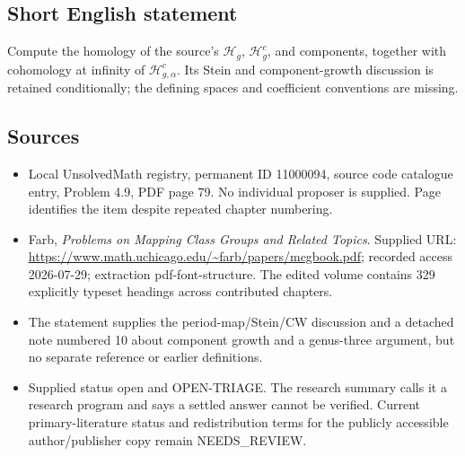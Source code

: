 \documentclass[11pt]{article}
\begin{document}
\subsection{Short English statement}
Compute the homology of the source's \(\mathcal H_g\), \(\mathcal H_g^c\), and components, together with cohomology at infinity of \(\mathcal H_{g,\alpha}^c\). Its Stein and component-growth discussion is retained conditionally; the defining spaces and coefficient conventions are missing.
\subsection{Sources}
\begin{itemize}
\item Local UnsolvedMath registry, permanent ID 11000094, source code catalogue entry, Problem 4.9, PDF page 79. No individual proposer is supplied. Page identifies the item despite repeated chapter numbering.
\item Farb, \emph{Problems on Mapping Class Groups and Related Topics}. Supplied URL: \url{https://www.math.uchicago.edu/~farb/papers/mcgbook.pdf}; recorded access 2026-07-29; extraction pdf-font-structure. The edited volume contains 329 explicitly typeset headings across contributed chapters.
\item The statement supplies the period-map/Stein/CW discussion and a detached note numbered 10 about component growth and a genus-three argument, but no separate reference or earlier definitions.
\item Supplied status open and OPEN-TRIAGE. The research summary calls it a research program and says a settled answer cannot be verified. Current primary-literature status and redistribution terms for the publicly accessible author/publisher copy remain NEEDS\_REVIEW.
\end{itemize}
\end{document}
